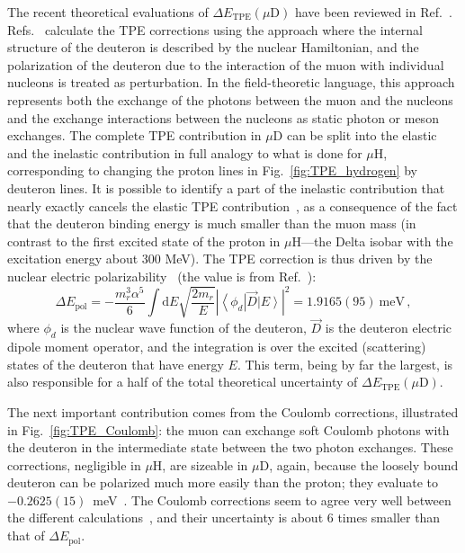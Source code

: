 \documentclass[prl,
twocolumn,
showpacs,preprintnumbers,amsmath,amssymb,
superscriptaddress,
a4paper,nofootinbib,longbibliography]{revtex4-2}
\begin{document}
The recent theoretical evaluations of $\Delta E_\text{TPE}(\mu\text{D})$ have been reviewed in Ref.~\cite{Krauth:2015nja}.
Refs.~\cite{Pachucki:2011xr,Pachucki:2015uga,Hernandez:2014pwa} calculate the TPE corrections using the
approach where the internal structure of the deuteron is described by the nuclear Hamiltonian, and the polarization of the deuteron
due to the interaction of the muon with individual nucleons is treated as perturbation. In the field-theoretic language,
this approach represents both the exchange of the photons between the muon and the nucleons and the exchange interactions between
the nucleons as static photon or meson exchanges. The complete TPE contribution in $\mu$D can be split into the elastic and the inelastic contribution in full analogy
to what is done for $\mu$H, corresponding to changing the proton lines in Fig.~\ref{fig:TPE_hydrogen} by deuteron lines.
It is possible to identify a part of the inelastic contribution that nearly exactly cancels the elastic TPE contribution~\cite{Pachucki:2011xr},
as a consequence of the fact that the deuteron binding energy is much smaller than the muon mass (in contrast to the first excited
state of the proton in $\mu$H---the Delta isobar with the excitation energy about 300 MeV).
The TPE correction is thus driven by the nuclear electric polarizability~\cite{Pachucki:2015uga,Friar:1977cf} (the value is from Ref.~\cite{Krauth:2015nja}):
\begin{equation}
\Delta E_\text{pol}=-\frac{m_r^3\alpha^5}{6}\int\mathrm{d}E\sqrt{\frac{2m_r}{E}}\left|\left\langle\phi_d\right|\vec D\left|E\right\rangle\right|^2= 1.9165(95)\ \text{meV}\,,
\label{eq:deltaEpol}
\end{equation}
where $\phi_d$ is the nuclear wave function of the deuteron, $\vec D$ is the deuteron electric dipole moment operator, and the integration
is over the excited (scattering) states of the deuteron that have energy $E$. 
This term, being by far the largest, is also responsible for a half of the total theoretical uncertainty of $\Delta E_\text{TPE}(\mu\text{D})$.

The next important contribution comes from the Coulomb corrections, illustrated in Fig.~\ref{fig:TPE_Coulomb}:
the muon can exchange soft Coulomb photons with the deuteron in the intermediate state between the two photon exchanges.
These corrections, negligible in $\mu$H, are sizeable in $\mu$D, again, because the loosely bound deuteron can be polarized much more easily than the proton;
they evaluate to $-0.2625(15)$~meV~\cite{Krauth:2015nja}.
The Coulomb corrections seem to agree very well between the different calculations~\cite{Pachucki:2011xr,Pachucki:2015uga,Hernandez:2014pwa},
and their uncertainty is about 6 times smaller than that of $\Delta E_\text{pol}$.
\end{document}
